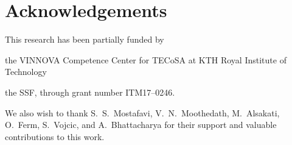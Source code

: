 \section*{Acknowledgements}\label{sec:acks}

This research has been partially funded by
\begin{enumerate*}[itemjoin={{; }}, itemjoin*={{; and }}]
    \item the VINNOVA Competence Center for \ac{TECoSA} at KTH Royal Institute of Technology
    \item the \ac{SSF}, through grant number ITM17--0246.
\end{enumerate*}

We also wish to thank S.~S.~Mostafavi, V.~N.~Moothedath, M.~Alsakati, O.~Ferm, S.~Vojcic, and A.~Bhattacharya for their support and valuable contributions to this work.
